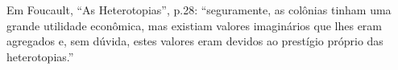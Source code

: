 Em Foucault, \enquote{As Heterotopias}, p.28: \enquote{seguramente, as colônias tinham uma grande utilidade econômica, mas existiam valores imaginários que lhes eram agregados e, sem dúvida, estes valores eram devidos ao prestígio próprio das heterotopias.}